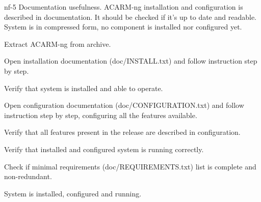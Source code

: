 \testCase
{nf-5}
{Documentation usefulness.}
{ACARM-ng installation and configuration is described in documentation. It should be checked if it's up to date and readable.}
{System is in compressed form, no component is installed nor configured yet.}
{
\begin{enumerate*}
\item Extract ACARM-ng from archive.
\item Open installation documentation (doc/INSTALL.txt) and follow instruction step by step.
\item Verify that system is installed and able to operate.
\item Open configuration documentation (doc/CONFIGURATION.txt) and follow instruction step by step, configuring all the features available.
\item Verify that all features present in the release are described in configuration.
\item Verify that installed and configured system is running correctly.
\item Check if minimal requirements (doc/REQUIREMENTS.txt) list is complete and non-redundant.
\end{enumerate*}
}
{System is installed, configured and running.}
{}
